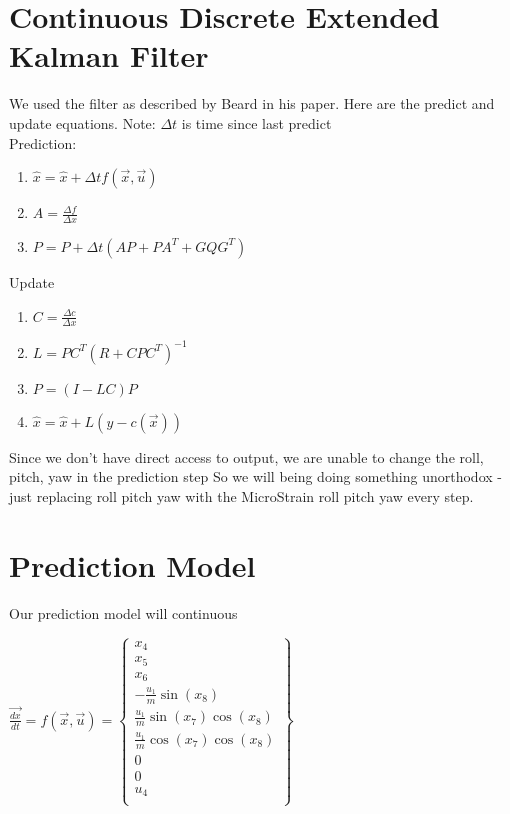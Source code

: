 \documentclass[12pt]{article}
\begin{document}
\section{Continuous Discrete Extended Kalman Filter}
We used the filter as described by Beard in his paper.
Here are the predict and update equations. Note: $\Delta t$ is time since last predict\\
Prediction:
\begin{enumerate}
\item $\hat{x} = \hat{x} + \Delta t f(\vec{x},\vec{u})$
\item $A = \frac{\Delta f}{\Delta x}$
\item $P = P + \Delta t (AP + PA^T + GQG^T)$
\end{enumerate}
Update
\begin{enumerate}
\item $C = \frac{\Delta c}{\Delta x}$
\item $L = PC^T(R + CPC^T)^{-1}$
\item $P = (I - LC)P$
\item $\hat{x} = \hat{x} + L(y - c(\vec{x}))$
\end{enumerate}

Since we don't have direct access to output, we are unable to change the roll, pitch, yaw in the prediction step
So we will being doing something unorthodox - just replacing roll pitch yaw with the MicroStrain roll pitch yaw every step.

\section{Prediction Model}
Our prediction model will continuous

\begin{center}
$\vec{\frac{dx}{dt}} =
f(\vec{x}, \vec{u}) =
\begin{Bmatrix}
x_{4}\\
x_{5}\\
x_{6}\\
-\frac{u_{1}}{m}\sin(x_{8})\\
\frac{u_{1}}{m}\sin(x_{7})\cos(x_{8})\\
\frac{u_{1}}{m}\cos(x_{7})\cos(x_{8})\\
0\\
0\\
u_{4}\\
\end{Bmatrix}
$
\end{center}
\end{document}
